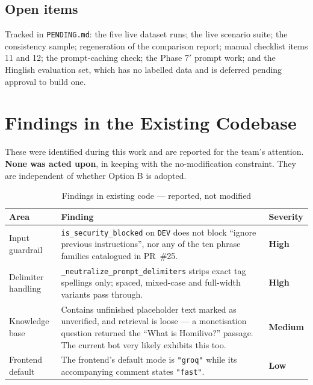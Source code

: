 \documentclass[11pt,a4paper]{article}
\newcommand{\fn}[1]{\texttt{\small #1}}
\begin{document}
\subsection{Open items}

Tracked in \fn{PENDING.md}: the five live dataset runs; the live scenario suite; the
consistency sample; regeneration of the comparison report; manual checklist items 11 and 12;
the prompt-caching check; the Phase 7$'$ prompt work; and the Hinglish evaluation set, which
has no labelled data and is deferred pending approval to build one.

\section{Findings in the Existing Codebase}
\label{sec:findings}

These were identified during this work and are reported for the team's attention. \textbf{None
was acted upon}, in keeping with the no-modification constraint. They are independent of
whether Option B is adopted.

\begin{table}[H]
\centering
\caption{Findings in existing code --- reported, not modified}
\small
\begin{tabularx}{\textwidth}{@{}>{\raggedright\arraybackslash}p{}>{\raggedright\arraybackslash}X l@{}}
\toprule
\textbf{Area} & \textbf{Finding} & \textbf{Severity}\\
\midrule
Input guardrail & \fn{is\_security\_blocked} on \fn{DEV} does not block ``ignore previous
instructions'', nor any of the ten phrase families catalogued in PR~\#25. &
\textbf{\color{hvred}High}\\
\addlinespace
Delimiter handling & \fn{\_neutralize\_prompt\_delimiters} strips exact tag spellings only;
spaced, mixed-case and full-width variants pass through. & \textbf{\color{hvred}High}\\
\addlinespace
Knowledge base & Contains unfinished placeholder text marked as unverified, and retrieval is
loose --- a monetisation question returned the ``What is Homilivo?'' passage. The current bot
very likely exhibits this too. & \textbf{\color{hvamber}Medium}\\
\addlinespace
Frontend default & The frontend's default mode is \fn{"groq"} while its accompanying comment
states \fn{"fast"}. & \textbf{\color{hvamber}Low}\\
\bottomrule
\end{tabularx}
\end{table}
\end{document}
